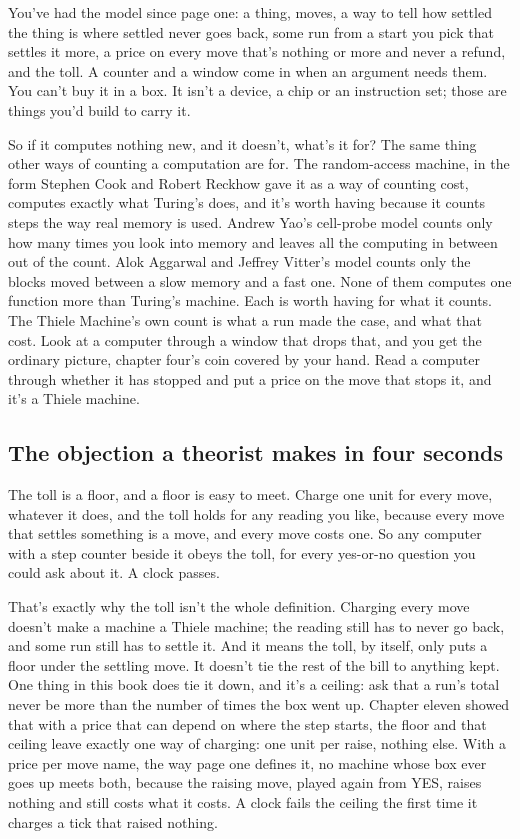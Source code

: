 \documentclass[11pt,twoside]{article}
\theoremstyle{thielethm}
\theoremstyle{thieledef}
\theoremstyle{thieledef}
\theoremstyle{thieledef}
\theoremstyle{thielethm}
\theoremstyle{thieleobs}
\theoremstyle{thielethm}
\begin{document}
You've had the model since page one: a thing, moves, a way to tell how settled the thing is where settled never goes back, some run from a start you pick that settles it more, a price on every move that's nothing or more and never a refund, and the toll. A counter and a window come in when an argument needs them. You can't buy it in a box. It isn't a device, a chip or an instruction set; those are things you'd build to carry it.

So if it computes nothing new, and it doesn't, what's it for? The same thing other ways of counting a computation are for. The random-access machine, in the form Stephen Cook and Robert Reckhow gave it as a way of counting cost, computes exactly what Turing's does, and it's worth having because it counts steps the way real memory is used. Andrew Yao's cell-probe model counts only how many times you look into memory and leaves all the computing in between out of the count. Alok Aggarwal and Jeffrey Vitter's model counts only the blocks moved between a slow memory and a fast one. None of them computes one function more than Turing's machine. Each is worth having for what it counts. The Thiele Machine's own count is what a run made the case, and what that cost. Look at a computer through a window that drops that, and you get the ordinary picture, chapter four's coin covered by your hand. Read a computer through whether it has stopped and put a price on the move that stops it, and it's a Thiele machine.

\subsection{The objection a theorist makes in four seconds}

The toll is a floor, and a floor is easy to meet. Charge one unit for every move, whatever it does, and the toll holds for any reading you like, because every move that settles something is a move, and every move costs one. So any computer with a step counter beside it obeys the toll, for every yes-or-no question you could ask about it. A clock passes.

That's exactly why the toll isn't the whole definition. Charging every move doesn't make a machine a Thiele machine; the reading still has to never go back, and some run still has to settle it. And it means the toll, by itself, only puts a floor under the settling move. It doesn't tie the rest of the bill to anything kept. One thing in this book does tie it down, and it's a ceiling: ask that a run's total never be more than the number of times the box went up. Chapter eleven showed that with a price that can depend on where the step starts, the floor and that ceiling leave exactly one way of charging: one unit per raise, nothing else. With a price per move name, the way page one defines it, no machine whose box ever goes up meets both, because the raising move, played again from YES, raises nothing and still costs what it costs. A clock fails the ceiling the first time it charges a tick that raised nothing.
\end{document}
